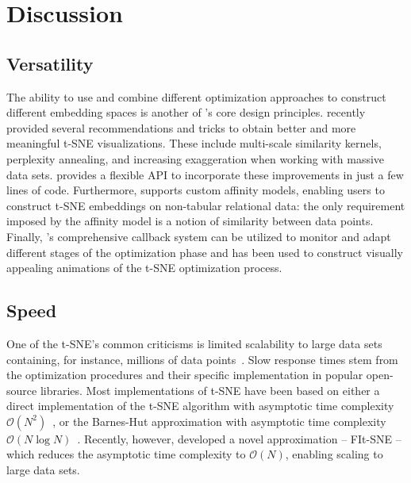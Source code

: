 \documentclass[article]{jss}
\newcommand{\opentsne}{\pkg{openTSNE}\xspace}
\begin{document}
\section{Discussion} \label{sec:discussion}

\subsection{Versatility}

The ability to use and combine different optimization approaches to construct different embedding spaces is another of \opentsne's core design principles. \citet{kobak2019art} recently provided several recommendations and tricks to obtain better and more meaningful t-SNE visualizations. These include multi-scale similarity kernels, perplexity annealing, and increasing exaggeration when working with massive data sets. \opentsne provides a flexible API to incorporate these improvements in just a few lines of code. Furthermore, \opentsne supports custom affinity models, enabling users to construct t-SNE embeddings on non-tabular relational data: the only requirement imposed by the affinity model is a notion of similarity between data points. Finally, \opentsne's comprehensive callback system can be utilized to monitor and adapt different stages of the optimization phase and has been used to construct visually appealing animations of the t-SNE optimization process.

\subsection{Speed}

One of the t-SNE's common criticisms is limited scalability to large data sets containing, for instance, millions of data points~\citep {becht2019dimensionality}. Slow response times stem from the optimization procedures and their specific implementation in popular open-source libraries. Most implementations of t-SNE have been based on either a direct implementation of the t-SNE algorithm with asymptotic time complexity $\mathcal{O}(N^2)$~\citep{maaten2008visualizing}, or the Barnes-Hut approximation with asymptotic time complexity $\mathcal{O}(N \log N)$~\citep{van2014accelerating}. Recently, however, \citet{linderman2019fast} developed a novel approximation -- FIt-SNE -- which reduces the asymptotic time complexity to $\mathcal {O}(N)$, enabling scaling to large data sets.
\end{document}
